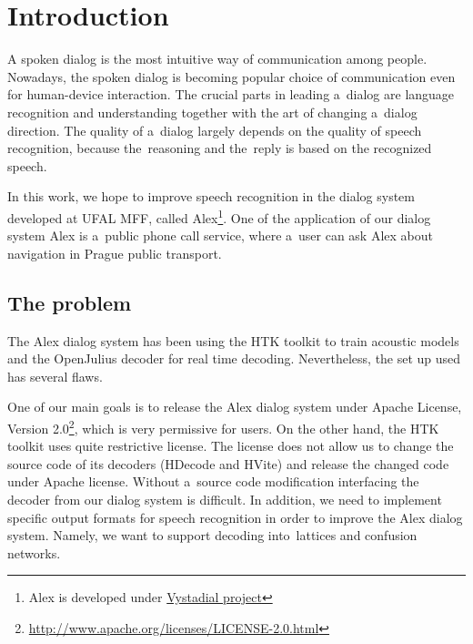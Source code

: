 \chapter{Introduction}
\label{chap:intro}

% 
% 
% 

A spoken dialog is the most intuitive way of communication among people. Nowadays, the spoken dialog is becoming popular choice of communication even for human-device interaction. The crucial parts in leading a~dialog are language recognition and understanding together with the art of changing a~dialog direction. The quality of a~dialog largely depends on the quality of speech recognition, because the~reasoning and the~reply is based on the recognized speech. 

In this work, we hope to improve speech recognition in the dialog system developed at UFAL MFF, called Alex\footnote{Alex is developed under \href{https://sites.google.com/site/filipjurcicek/projects/vystadial}{Vystadial project}}. One of the application of our dialog system Alex is a~public phone call service, where a~user can ask Alex about navigation in Prague public transport.


\section{The problem} 
\label{sec:why}
The Alex dialog system has been using the HTK toolkit to train acoustic models and the OpenJulius decoder for real time decoding.
Nevertheless, the set up used has several flaws.

One of our main goals is to release the Alex dialog system under Apache License, Version 2.0\footnote{\url{http://www.apache.org/licenses/LICENSE-2.0.html}}, which is very permissive for users. On the other hand, the HTK toolkit uses quite restrictive license. The license does not allow us to change the source code of its decoders (HDecode and HVite) and release the changed code under Apache license. Without a~source code modification interfacing the decoder from our dialog system is difficult. In addition, we need to implement specific output formats for speech recognition in order to improve the Alex dialog system. Namely, we want to support decoding into~lattices and confusion networks. 

